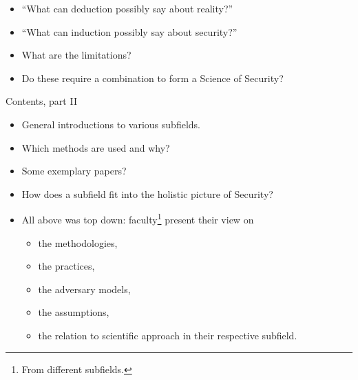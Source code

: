 \begin{frame}
  \begin{example}
    \begin{itemize}
      \item \enquote{What can deduction possibly say about reality?}
    \end{itemize}
  \end{example}

  \pause

  \begin{example}
    \begin{itemize}
      \item \enquote{What can induction possibly say about security?}
    \end{itemize}
  \end{example}

  \pause

  \begin{remark}[To focus on]
    \begin{itemize}
      \item What are the limitations?
      \item Do these require a combination to form a Science of Security?
    \end{itemize}
  \end{remark}
\end{frame}

\begin{frame}
  \begin{block}{Contents, part II}
    \begin{itemize}
      \item General introductions to various subfields.
      \item Which methods are used and why?
      \item Some exemplary papers?
      \item How does a subfield fit into the holistic picture of Security?
    \end{itemize}
  \end{block}
\end{frame}

\begin{frame}
  \begin{remark}
    \begin{itemize}
      \item All above was top down: faculty\footnote{%
          From different subfields.
        } present their view on
        \begin{itemize}
          \item the methodologies,
          \item the practices,
          \item the adversary models,
          \item the assumptions,
          \item the relation to scientific approach in their respective 
            subfield.
        \end{itemize}
    \end{itemize}
  \end{remark}
\end{frame}

